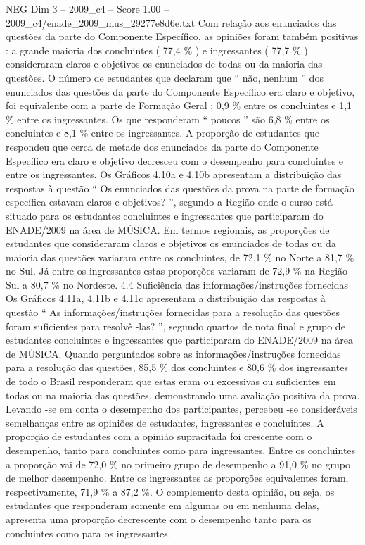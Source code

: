 \begin{textsample}{NEG Dim 3 – 2009\_c4 – Score 1.00 – 2009\_c4/enade\_2009\_mus\_29277e8d6e.txt}
Com relação aos enunciados das questões da parte do Componente Específico, as opiniões foram também positivas : a grande maioria dos concluintes ( 77,4 \% ) e ingressantes ( 77,7 \% ) consideraram claros e objetivos os enunciados de todas ou da maioria das questões.
O número de estudantes que declaram que “ não, nenhum ” dos enunciados das questões da parte do Componente Específico era claro e objetivo, foi equivalente com a parte de Formação Geral : 0,9 \% entre os concluintes e 1,1 \% entre os ingressantes.
Os que responderam “ poucos ” são 6,8 \% entre os concluintes e 8,1 \% entre os ingressantes.
A proporção de estudantes que respondeu que cerca de metade dos enunciados da parte do Componente Específico era claro e objetivo decresceu com o desempenho para concluintes e entre os ingressantes.
Os Gráficos 4.10a e 4.10b apresentam a distribuição das respostas à questão “ Os enunciados das questões da prova na parte de formação específica estavam claros e objetivos? ”, segundo a Região onde o curso está situado para os estudantes concluintes e ingressantes que participaram do ENADE/2009 na área de MÚSICA.
Em termos regionais, as proporções de estudantes que consideraram claros e objetivos os enunciados de todas ou da maioria das questões variaram entre os concluintes, de 72,1 \% no Norte a 81,7 \% no Sul.
Já entre os ingressantes estas proporções variaram de 72,9 \% na Região Sul a 80,7 \% no Nordeste. 4.4 Suficiência das informações/instruções fornecidas Os Gráficos 4.11a, 4.11b e 4.11c apresentam a distribuição das respostas à questão “ As informações/instruções fornecidas para a resolução das questões foram suficientes para resolvê -las? ”, segundo quartos de nota final e grupo de estudantes concluintes e ingressantes que participaram do ENADE/2009 na área de MÚSICA.
Quando perguntados sobre as informações/instruções fornecidas para a resolução das questões, 85,5 \% dos concluintes e 80,6 \% dos ingressantes de todo o Brasil responderam que estas eram ou excessivas ou suficientes em todas ou na maioria das questões, demonstrando uma avaliação positiva da prova.
Levando -se em conta o desempenho dos participantes, percebeu -se consideráveis semelhanças entre as opiniões de estudantes, ingressantes e concluintes.
A proporção de estudantes com a opinião supracitada foi crescente com o desempenho, tanto para concluintes como para ingressantes.
Entre os concluintes a proporção vai de 72,0 \% no primeiro grupo de desempenho a 91,0 \% no grupo de melhor desempenho.
Entre os ingressantes as proporções equivalentes foram, respectivamente, 71,9 \% a 87,2 \%.
O complemento desta opinião, ou seja, os estudantes que responderam somente em algumas ou em nenhuma delas, apresenta uma proporção decrescente com o desempenho tanto para os concluintes como para os ingressantes.

\end{textsample}

